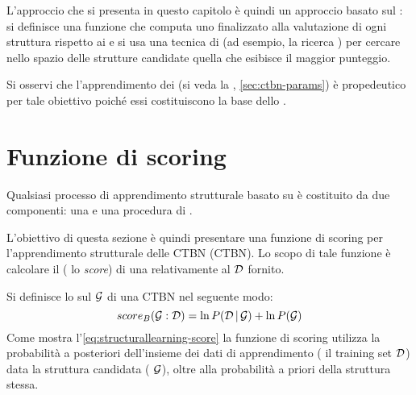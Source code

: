 L'approccio che si presenta in questo capitolo è quindi un approccio basato sul : si definisce una funzione che computa uno \emph{} finalizzato alla valutazione di ogni struttura rispetto ai  e si usa una tecnica di  (ad esempio, la ricerca \emph{}) per cercare nello spazio delle strutture candidate quella che esibisce il maggior punteggio.

Si osservi che l'apprendimento dei  (si veda la , \autoref{sec:ctbn-params}) è propedeutico per tale obiettivo poiché essi costituiscono la base dello .

\cleardoublepage
\section{Funzione di scoring}\label{sec:ctbn-structurallearning-score}
Qualsiasi processo di apprendimento strutturale basato su  è costituito da due componenti: una \emph{} e una procedura di .

L'obiettivo di questa sezione è quindi presentare una funzione di scoring per l'apprendimento strutturale delle \acl{CTBN} (\acs{CTBN}). Lo scopo di tale funzione è calcolare il  (\ie{} lo \emph{score}) di una  relativamente al \emph{} $\mathcal{D}$ fornito.

Si definisce lo \emph{} sul  $\mathcal{G}$ di una \acs{CTBN} nel seguente modo:
\begin{equation}\label{eq:structurallearning-score}
score_B(\mathcal{G}:\mathcal{D})=\ln{P(\mathcal{D}\,\arrowvert\,\mathcal{G})} + \ln{P(\mathcal{G})}
\end{equation}
Come mostra l'\autoref{eq:structurallearning-score} la funzione di scoring utilizza la probabilità a posteriori dell'insieme dei dati di apprendimento (\ie{} il training set $\mathcal{D}$) data la struttura candidata (\ie{} $\mathcal{G}$), oltre alla probabilità a priori della struttura stessa.

